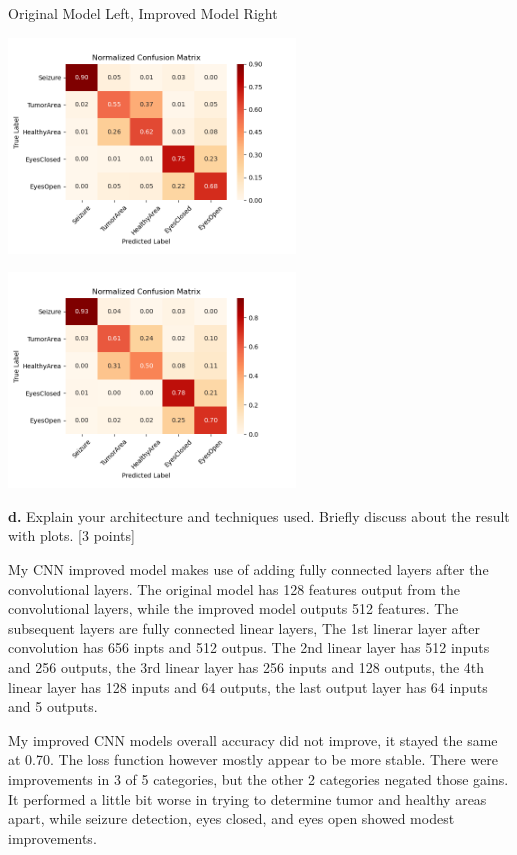 \documentclass[12pt]{article}
\begin{document}
{{{{{{{{{{{{{{\bigskip

Original Model Left, Improved Model Right

\bigskip

{\includegraphics[width = 3in]{images/CNN_confusion_matrix}
{\includegraphics[width = 3in]{images/CNN_improved_confusion_matrix}

\bigskip
\textbf{d.} Explain your architecture and techniques used. Briefly discuss about the result with plots. [3 points]

\bigskip

My CNN improved model makes use of adding fully connected layers after the convolutional layers.  The original model has 128 features output from the convolutional layers, while the improved model outputs 512 features.  The subsequent layers are fully connected linear layers,  The 1st linerar layer after convolution has 656 inpts and 512 outpus.  The 2nd linear layer has 512 inputs and 256 outputs, the 3rd linear layer has 256 inputs and 128 outputs, the 4th linear layer has 128 inputs and 64 outputs, the last output layer has 64 inputs and 5 outputs. 

\bigskip

My improved CNN models overall accuracy did not improve, it stayed the same at 0.70.  The loss function however mostly appear to be more stable.  There were improvements in 3 of 5 categories, but the other 2 categories negated those gains.  It performed a little bit worse in trying to determine tumor and healthy areas apart, while seizure detection, eyes closed, and eyes open showed modest improvements.

}}}}}}}}}}}}}}}}
\end{document}
